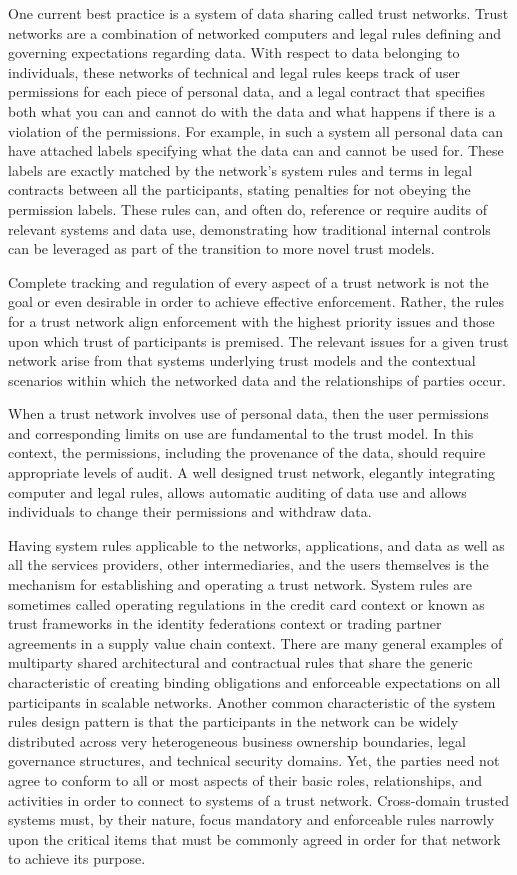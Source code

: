 One current best practice is a system of data sharing called trust networks.
Trust networks are a combination of networked computers and legal rules defining and governing expectations regarding data.
With respect to data belonging to individuals, these networks of technical and legal rules keeps track of user permissions for each piece of personal data, and a legal contract that specifies both what you can and cannot do with the data and what happens if there is a violation of the permissions.
For example, in such a system all personal data can have attached labels specifying what the data can and cannot be used for.
These labels are exactly matched by the network's system rules and terms in legal contracts between all the participants, stating penalties for not obeying the permission labels.
These rules can, and often do, reference or require audits of relevant systems and data use, demonstrating how traditional internal controls can be leveraged as part of the transition to more novel trust models.

Complete tracking and regulation of every aspect of a trust network is not the goal or even desirable in order to achieve effective enforcement.
Rather, the rules for a trust network align enforcement with the highest priority issues and those upon which trust of participants is premised.
The relevant issues for a given trust network arise from that systems  underlying trust models and the contextual scenarios within which the networked data and the relationships of parties occur.

When a trust network involves use of personal data, then the user permissions and corresponding limits on use are fundamental to the trust model.
In this context, the permissions, including the provenance of the data, should require appropriate levels of audit.
A well designed trust network, elegantly integrating computer and legal rules, allows automatic auditing of data use and allows individuals to change their permissions and withdraw data.

Having system rules applicable to the networks, applications, and data as well as all the services providers, other intermediaries, and the users themselves is the mechanism for establishing and operating a trust network.
System rules are sometimes called operating regulations in the credit card context or known as trust frameworks in the identity federations context or trading partner agreements in a supply value chain context.
There are many general examples of multiparty shared architectural and contractual rules that share the generic characteristic of creating binding obligations and enforceable expectations on all participants in scalable networks.
Another common characteristic of the system rules design pattern is that the participants in the network can be widely distributed across very heterogeneous business ownership boundaries, legal governance structures, and technical security domains.
Yet, the parties need not agree to conform to all or most aspects of their basic roles, relationships, and activities in order to connect to systems of a trust network.
Cross-domain trusted systems must, by their nature, focus mandatory and enforceable rules narrowly upon the critical items that must be commonly agreed in order for that network to achieve its purpose.

